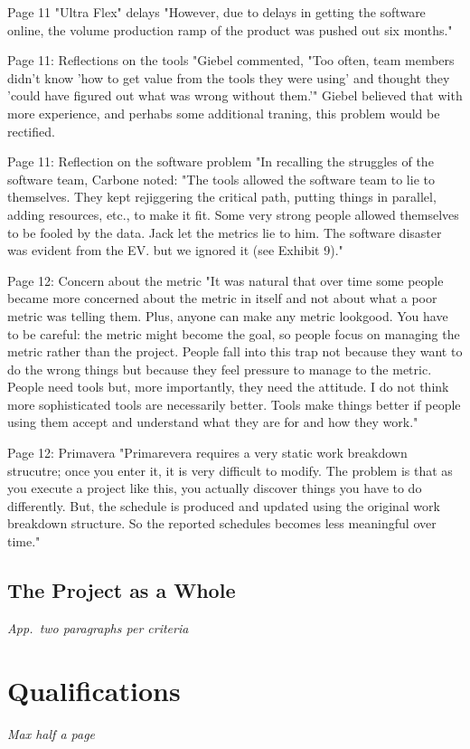 Page 11
"Ultra Flex" delays
"However, due to delays in getting the software online, the volume production ramp of the product was pushed out six months."

Page 11:
Reflections on the tools
"Giebel commented, "Too often, team members didn't know 'how to get value from the tools they were using' and thought they 'could have figured out what was wrong without them.'" Giebel believed that with more experience, and perhabs some additional traning, this problem would be rectified. 

Page 11: 
Reflection on the software problem
"In recalling the struggles of the software team, Carbone noted: "The tools allowed the software team to lie to themselves. They kept rejiggering the critical path, putting things in parallel, adding resources, etc., to make it fit. Some very strong people allowed themselves to be fooled by the data. Jack let the metrics lie to him. The software disaster was evident from the EV. but we ignored it (see Exhibit 9)."

Page 12:
Concern about the metric
"It was natural that over time some people became more concerned about the metric in itself and not about what a poor metric was telling them. Plus, anyone can make any metric lookgood. You have to be careful: the metric might become the goal, so people focus on managing the metric rather than the project. People fall into this trap not because they want to do the wrong things but because they feel pressure to manage to the metric. People need tools but, more importantly, they need the attitude. I do not think more sophisticated tools are necessarily better. Tools make things better if people using them accept and understand what they are for and how they work."

Page 12:
Primavera
"Primarevera requires a very static work breakdown strucutre; once you enter it, it is very difficult to modify. The problem is that as you execute a project like this, you actually discover things you have to do differently. But, the schedule is produced and updated using the original work breakdown structure. So the reported schedules becomes less meaningful over time." 

\subsection{The Project as a Whole}

\emph{App.\ two paragraphs per criteria}

\section{Qualifications}


\emph{Max half a page}

\nocite{Larson2021}